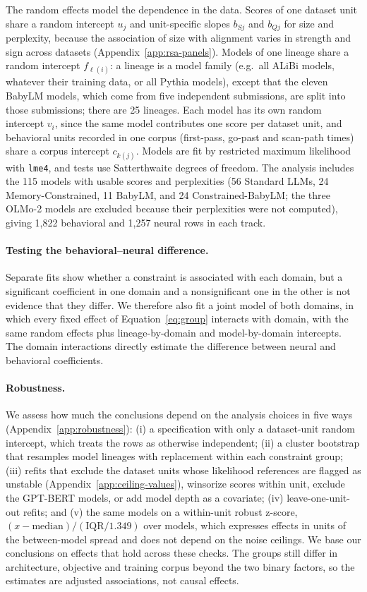 The random effects model the dependence in the data. Scores of one dataset unit share a random intercept $u_j$ and unit-specific slopes $b_{Sj}$ and $b_{Qj}$ for size and perplexity, because the association of size with alignment varies in strength and sign across datasets (Appendix~\ref{app:rsa-panels}). Models of one lineage share a random intercept $f_{\ell(i)}$: a lineage is a model family (e.g.\ all ALiBi models, whatever their training data, or all Pythia models), except that the eleven BabyLM models, which come from five independent submissions, are split into those submissions; there are 25 lineages. Each model has its own random intercept $v_i$, since the same model contributes one score per dataset unit, and behavioral units recorded in one corpus (first-pass, go-past and scan-path times) share a corpus intercept $c_{k(j)}$. Models are fit by restricted maximum likelihood with \texttt{lme4}, and tests use Satterthwaite degrees of freedom. The analysis includes the 115 models with usable scores and perplexities (56 Standard LLMs, 24 Memory-Constrained, 11 BabyLM, and 24 Constrained-BabyLM; the three OLMo-2 models are excluded because their perplexities were not computed), giving 1,822 behavioral and 1,257 neural rows in each track.

\paragraph{Testing the behavioral--neural difference.}
Separate fits show whether a constraint is associated with each domain, but a significant coefficient in one domain and a nonsignificant one in the other is not evidence that they differ. We therefore also fit a joint model of both domains, in which every fixed effect of Equation~\ref{eq:group} interacts with domain, with the same random effects plus lineage-by-domain and model-by-domain intercepts. The domain interactions directly estimate the difference between neural and behavioral coefficients.

\paragraph{Robustness.}
We assess how much the conclusions depend on the analysis choices in five ways (Appendix~\ref{app:robustness}): (i) a specification with only a dataset-unit random intercept, which treats the rows as otherwise independent; (ii) a cluster bootstrap that resamples model lineages with replacement within each constraint group; (iii) refits that exclude the dataset units whose likelihood references are flagged as unstable (Appendix~\ref{app:ceiling-values}), winsorize scores within unit, exclude the GPT-BERT models, or add model depth as a covariate; (iv) leave-one-unit-out refits; and (v) the same models on a within-unit robust z-score, $(x-\mathrm{median})/(\mathrm{IQR}/1.349)$ over models, which expresses effects in units of the between-model spread and does not depend on the noise ceilings. We base our conclusions on effects that hold across these checks. The groups still differ in architecture, objective and training corpus beyond the two binary factors, so the estimates are adjusted associations, not causal effects.

